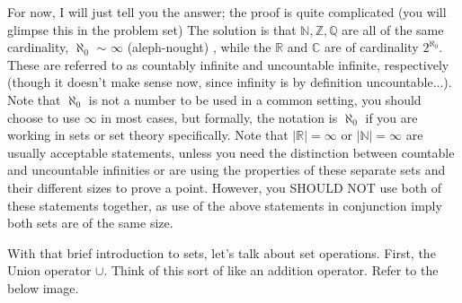 For now, I will just tell you the answer; the proof is quite complicated (you will glimpse this in the problem set) The solution is that $\mathbb{N}, \mathbb{Z}, \mathbb{Q}$ are all of the same cardinality, $\aleph_0$ $\sim$ $\infty$ (aleph-nought) , while the $\mathbb{R}$ and $\mathbb{C}$ are of cardinality $2^{\aleph_0}$. These are referred to as countably infinite and uncountable infinite, respectively (though it doesn't make sense now, since infinity is by definition uncountable...). Note that $\aleph_0$ is not a number to be used in a common setting, you should choose to use $\infty$ in most cases, but formally, the notation is $\aleph_0$ if you are working in sets or set theory specifically. Note that $|\mathbb{R}| = \infty$ or $|\mathbb{N}| = \infty$ are usually acceptable statements, unless you need the distinction between countable and uncountable infinities or are using the properties of these separate sets and their different sizes to prove a point. However, you SHOULD NOT use both of these statements together, as use of the above statements in conjunction imply both sets are of the same size.

With that brief introduction to sets, let's talk about set operations. First, the Union operator $\cup$. Think of this sort of like an addition operator. Refer to the below image.

\begin{center}
\end{center}

